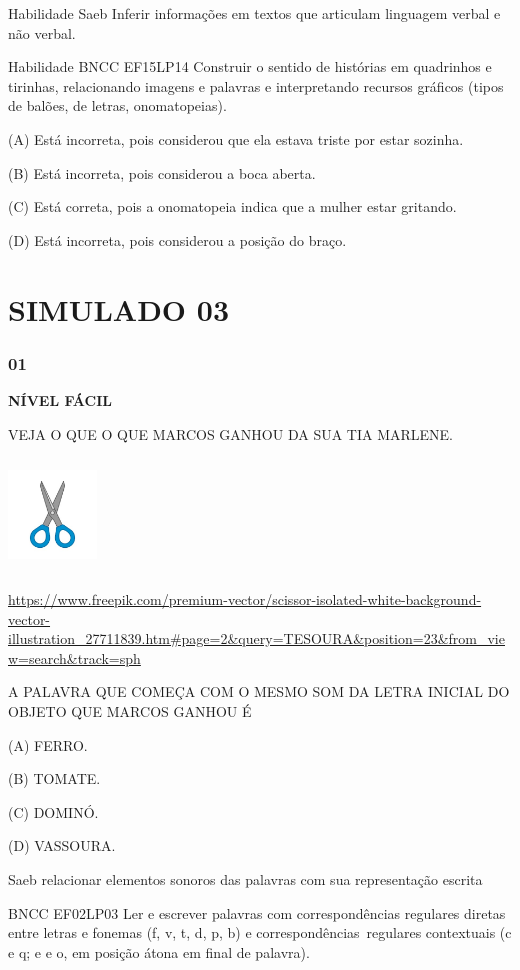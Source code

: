 Habilidade Saeb Inferir informações em textos que articulam linguagem
verbal e não verbal.

Habilidade BNCC EF15LP14 Construir o sentido de histórias em quadrinhos
e tirinhas, relacionando imagens e palavras e interpretando recursos
gráficos (tipos de balões, de letras, onomatopeias).

(A) Está incorreta, pois considerou que ela estava triste por estar
sozinha.

(B) Está incorreta, pois considerou a boca aberta.

(C) Está correta, pois a onomatopeia indica que a mulher estar gritando.

(D) Está incorreta, pois considerou a posição do braço.

\section{SIMULADO 03}\label{simulado-03}

\subsubsection{01}\label{section-127}

\textbf{NÍVEL FÁCIL}

VEJA O QUE O QUE MARCOS GANHOU DA SUA TIA MARLENE.

\includegraphics[width=0.92708in,height=1.18125in]{media/image163.jpeg}

\url{https://www.freepik.com/premium-vector/scissor-isolated-white-background-vector-illustration_27711839.htm\#page=2\&query=TESOURA\&position=23\&from_view=search\&track=sph}

A PALAVRA QUE COMEÇA COM O MESMO SOM DA LETRA INICIAL DO OBJETO QUE
MARCOS GANHOU É

(A) FERRO.

(B) TOMATE.

(C) DOMINÓ.

(D) VASSOURA.

Saeb relacionar elementos sonoros das palavras com sua representação
escrita

BNCC EF02LP03 Ler e escrever palavras com correspondências regulares
diretas entre letras e fonemas (f, v, t, d, p, b) e
correspondências~regulares contextuais (c e q; e e o, em posição átona
em final de palavra).

